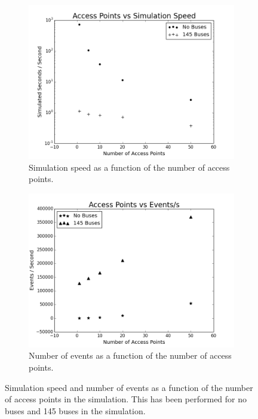             \begin{figure}
                \centering
                \begin{subfigure}{0.5\textwidth}
                    \centering
                    \includegraphics[width=\linewidth]{./images/AP_vs_Simulation_Speed.png}
                    \caption{Simulation speed as a function of the number of access points.}
                    \label{fig:access_points_speed}
                \end{subfigure}%
                \begin{subfigure}{0.5\textwidth}
                    \includegraphics[width=\linewidth]{./images/AP_vs_Events.png}
                    \caption{Number of events as a function of the number of access points.}
                    \label{fig:access_points_events}
                \end{subfigure}
                \caption{Simulation speed and number of events as a function of the number of access points in the simulation. This has been performed for no buses and 145 buses in the simulation.}
                \label{fig:access_points_vs_time_and_events}
            \end{figure}

